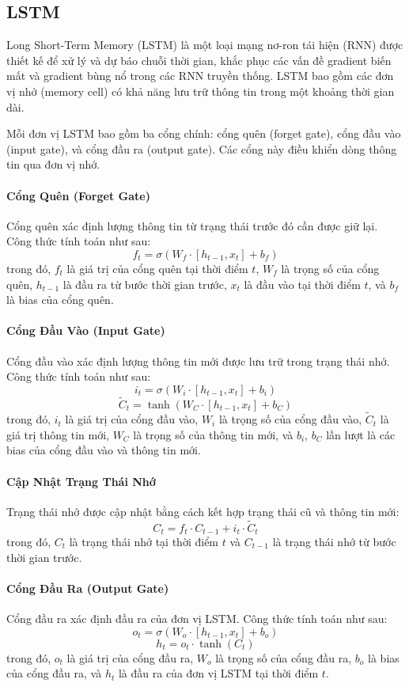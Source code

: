 \subsection{LSTM}

Long Short-Term Memory (LSTM) là một loại mạng nơ-ron tái hiện (RNN) được thiết kế để xử lý và dự báo chuỗi thời gian, khắc phục các vấn đề gradient biến mất và gradient bùng nổ trong các RNN truyền thống. LSTM bao gồm các đơn vị nhớ (memory cell) có khả năng lưu trữ thông tin trong một khoảng thời gian dài.

Mỗi đơn vị LSTM bao gồm ba cổng chính: cổng quên (forget gate), cổng đầu vào (input gate), và cổng đầu ra (output gate). Các cổng này điều khiển dòng thông tin qua đơn vị nhớ.

\paragraph{Cổng Quên (Forget Gate)}

Cổng quên xác định lượng thông tin từ trạng thái trước đó cần được giữ lại. Công thức tính toán như sau:
\[
f_t = \sigma(W_f \cdot [h_{t-1}, x_t] + b_f)
\]
trong đó, $f_t$ là giá trị của cổng quên tại thời điểm $t$, $W_f$ là trọng số của cổng quên, $h_{t-1}$ là đầu ra từ bước thời gian trước, $x_t$ là đầu vào tại thời điểm $t$, và $b_f$ là bias của cổng quên.

\paragraph{Cổng Đầu Vào (Input Gate)}

Cổng đầu vào xác định lượng thông tin mới được lưu trữ trong trạng thái nhớ. Công thức tính toán như sau:
\[
i_t = \sigma(W_i \cdot [h_{t-1}, x_t] + b_i)
\]
\[
\tilde{C}_t = \tanh(W_C \cdot [h_{t-1}, x_t] + b_C)
\]
trong đó, $i_t$ là giá trị của cổng đầu vào, $W_i$ là trọng số của cổng đầu vào, $\tilde{C}_t$ là giá trị thông tin mới, $W_C$ là trọng số của thông tin mới, và $b_i$, $b_C$ lần lượt là các bias của cổng đầu vào và thông tin mới.

\paragraph{Cập Nhật Trạng Thái Nhớ}

Trạng thái nhớ được cập nhật bằng cách kết hợp trạng thái cũ và thông tin mới:
\[
C_t = f_t \cdot C_{t-1} + i_t \cdot \tilde{C}_t
\]
trong đó, $C_t$ là trạng thái nhớ tại thời điểm $t$ và $C_{t-1}$ là trạng thái nhớ từ bước thời gian trước.

\paragraph{Cổng Đầu Ra (Output Gate)}

Cổng đầu ra xác định đầu ra của đơn vị LSTM. Công thức tính toán như sau:
\[
o_t = \sigma(W_o \cdot [h_{t-1}, x_t] + b_o)
\]
\[
h_t = o_t \cdot \tanh(C_t)
\]
trong đó, $o_t$ là giá trị của cổng đầu ra, $W_o$ là trọng số của cổng đầu ra, $b_o$ là bias của cổng đầu ra, và $h_t$ là đầu ra của đơn vị LSTM tại thời điểm $t$.
